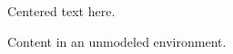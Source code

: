 \begin{center}
Centered text here.
\end{center}

\begin{unknownenv}
Content in an unmodeled environment.
\end{unknownenv}
